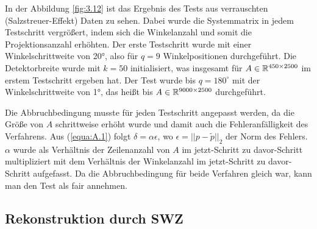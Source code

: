 In der Abbildung \ref{fig:3.12} ist das Ergebnis des Tests aus verrauschten (Salzstreuer-Effekt) Daten zu sehen. Dabei wurde die Systemmatrix in jedem Testschritt vergrößert, indem sich die Winkelanzahl und somit die Projektionsanzahl erhöhten. Der erste Testschritt wurde mit einer Winkelschrittweite von 20°, also für $q = 9$ Winkelpositionen durchgeführt. Die Detektorbreite wurde mit $k = 50$ initialisiert, was insgesamt für $A \in \mathbb{R}^{450\times2500}$ im erstem Testschritt ergeben hat. Der Test wurde bis $q = 180^{\circ}$ mit der Winkelschrittweite von 1°, das heißt bis $A \in \mathbb{R}^{9000 \times 2500}$ durchgeführt.

Die Abbruchbedingung musste für jeden Testschritt angepasst werden, da die Größe von $A$ schrittweise erhöht wurde und damit auch die Fehleranfälligkeit des Verfahrens. Aus (\ref{equa:A.1}) folgt $\delta = \alpha\epsilon$, wo $\epsilon = ||p - \tilde{p}||_2$ der Norm des Fehlers. $\alpha$ wurde als Verhältnis der Zeilenanzahl von $A$ im jetzt-Schritt zu davor-Schritt multipliziert mit dem Verhältnis der Winkelanzahl im jetzt-Schritt zu davor-Schritt aufgefasst. Da die Abbruchbedingung für beide Verfahren gleich war, kann man den Test als fair annehmen.

\subsection*{Rekonstruktion durch SWZ}
\label{cha:3.2.2}

